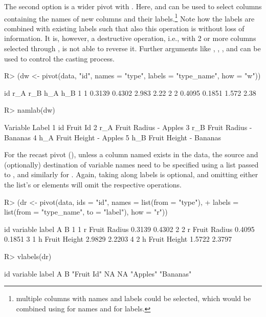 \documentclass[nojss]{jss} %
\newcommand{\fct}[1]{\code{#1()}}
\begin{document}
The second option is a wider pivot with . Here,  and  can be used to select columns containing the names of new columns and their labels.\footnote{multiple columns with names and labels could be selected, which would be combined using  for names and  for labels.} Note how the labels are combined with existing labels such that also this operation is without loss of information. It is, however, a destructive operation, i.e., with 2 or more columns selected through , \fct{pivot} is not able to reverse it. Further arguments like , , , and  can be used to control the casting process.
%
\begin{Schunk}
\begin{Sinput}
R> (dw <- pivot(data, "id", names = "type", labels = "type_name", how = "w"))
\end{Sinput}
\begin{Soutput}
  id    r_A    r_B   h_A  h_B
1  1 0.3139 0.4302 2.983 2.22
2  2 0.4095 0.1851 1.572 2.38
\end{Soutput}
\begin{Sinput}
R> namlab(dw)
\end{Sinput}
\begin{Soutput}
  Variable                  Label
1       id               Fruit Id
2      r_A  Fruit Radius - Apples
3      r_B Fruit Radius - Bananas
4      h_A  Fruit Height - Apples
5      h_B Fruit Height - Bananas
\end{Soutput}
\end{Schunk}
%
For the recast pivot (), unless a column named  exists in the data, the source and (optionally) destination of variable names need to be specified using a list passed to , and similarly for . Again, taking along labels is optional, and omitting either the list's  or  elements will omit the respective operations.
%
\begin{Schunk}
\begin{Sinput}
R> (dr <- pivot(data, ids = "id", names = list(from = "type"),
+               labels = list(from = "type_name", to = "label"), how = "r"))
\end{Sinput}
\begin{Soutput}
  id variable        label      A      B
1  1        r Fruit Radius 0.3139 0.4302
2  2        r Fruit Radius 0.4095 0.1851
3  1        h Fruit Height 2.9829 2.2203
4  2        h Fruit Height 1.5722 2.3797
\end{Soutput}
\begin{Sinput}
R> vlabels(dr)
\end{Sinput}
\begin{Soutput}
        id   variable      label          A          B 
"Fruit Id"         NA         NA   "Apples"  "Bananas" 
\end{Soutput}
\end{Schunk}
\end{document}
